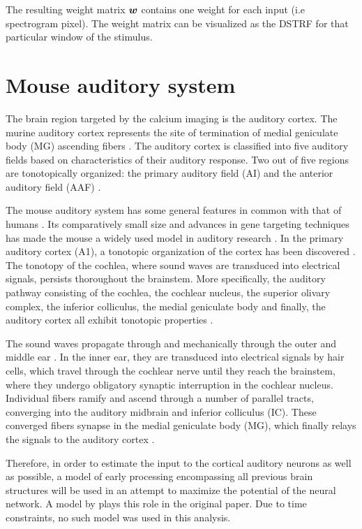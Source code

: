 The resulting weight matrix $\bm{w}$ contains one weight for each input (i.e spectrogram pixel). The weight matrix can be visualized as the DSTRF for that particular window of the stimulus.

\section{Mouse auditory system}
The brain region targeted by the calcium imaging is the auditory cortex. The murine auditory cortex represents the site of termination of medial geniculate body (MG) ascending fibers \parencite{malmiercaAuditorySystem2012}. The auditory cortex is classified into five auditory fields based on characteristics of their auditory response. Two out of five regions are tonotopically organized: the primary auditory field (AI) and the anterior auditory field (AAF) \parencite{malmiercaAuditorySystem2012}.

The mouse auditory system has some general features in common with that of humans \parencite{malmiercaAuditorySystem2012}. Its comparatively small size and advances in gene targeting techniques has made the mouse a widely used model in auditory research \parencite{malmiercaAuditorySystem2012}. In the primary auditory cortex (A1), a tonotopic organization of the cortex has been discovered  \parencite{malmiercaAuditorySystem2012}. The tonotopy of the cochlea, where sound waves are transduced into electrical signals, persists thoroughout the brainstem. More specifically, the auditory pathway consisting of the cochlea, the cochlear nucleus, the superior olivary complex, the inferior colliculus, the medial geniculate body and finally, the auditory cortex all exhibit tonotopic properties  \parencite{malmiercaAuditorySystem2012}.

The sound waves propagate through and mechanically through the outer and middle ear \parencite{malmiercaAuditorySystem2012}. In the inner ear, they are transduced into electrical signals by hair cells, which travel through the cochlear nerve until they reach the brainstem, where they undergo obligatory synaptic interruption in the cochlear nucleus. Individual fibers ramify and ascend through a number of parallel tracts, converging into the auditory midbrain and inferior colliculus (IC). These converged fibers synapse in the medial geniculate body (MG), which finally relays the signals to the auditory cortex \parencite{malmiercaAuditorySystem2012}.

Therefore, in order to estimate the input to the cortical auditory neurons as well as possible, a model of early processing encompassing all previous brain structures will be used in an attempt to maximize the potential of the neural network. A model by \textcite{yangAuditoryRepresentationsAcoustic1992} plays this role in the original paper. Due to time constraints, no such model was used in this analysis.

